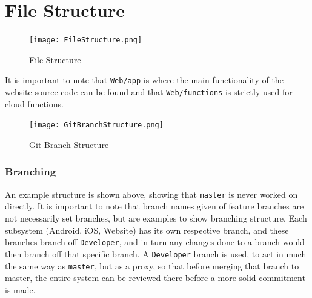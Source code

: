 \documentclass[12pt]{article}
\begin{document}
\section{File Structure}
  \flushleft
  \begin{figure}
  \texttt{[image: FileStructure.png]}
  \caption{File Structure}
  \label{FileStructure}
  \end{figure}
  
  It is important to note that \texttt{Web/app} is where the main functionality of the website source code can be found and that \texttt{Web/functions} is strictly used for cloud functions.

  \begin{figure}
  \texttt{[image: GitBranchStructure.png]}
  \caption{Git Branch Structure}
  \label{GitBranchStructure}
  \end{figure}

\flushleft\subsubsection{Branching}
  An example structure is shown above, showing that \texttt{master} is never worked on directly. It is important to note that branch names given of feature branches are not necessarily set branches, but are examples to show branching structure. Each subsystem (Android, iOS, Website) has its own respective branch, and these branches branch off \texttt{Developer}, and in turn any changes done to a branch would then branch off that specific branch.
  A \texttt{Developer} branch is used, to act in much the same way as \texttt{master}, but as a proxy, so that before merging that branch to master, the entire system can be reviewed there before a more solid commitment is made.
\end{document}
